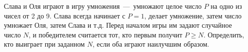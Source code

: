 Слава и Оля играют в игру умножения~---~умножают целое число $P$ на одно из чисел от 2 до 9. Слава всегда начинает с $P = 1$, делает умножение, затем число умножает Оля, затем Слава и т.д. Перед началом игры им задают случайное число $N$, и победителем считается тот, кто первым получит $P \ge N$. Определить, кто выиграет при заданном $N$, если оба играют наилучшим образом.
